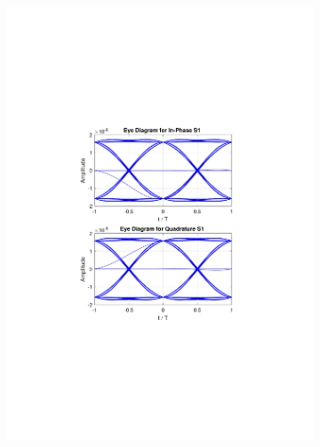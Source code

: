 \begin{figure}
	\centering
	\begin{subfigure}{.5\textwidth}
		\centering
		\includegraphics[clip, trim=4cm 8cm 4cm 8cm, width=\textwidth]{./sdf/m_qam_system/figures/eye_diagram_S1_120.pdf}
	\end{subfigure}%
	\begin{subfigure}{.5\textwidth}
		\centering

\end{subfigure}
\end{figure}
